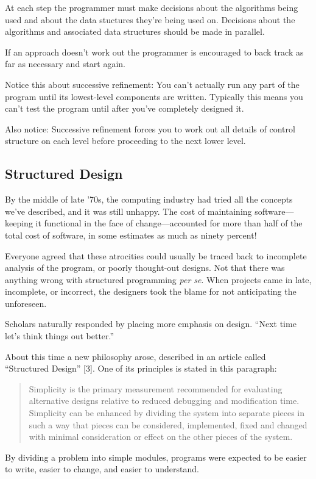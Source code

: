 At each step the programmer must make decisions about the algorithms
being used and about the data stuctures they're being used on. Decisions
about the algorithms and associated data structures should be made
in parallel.

If an approach doesn't work out the programmer is encouraged to back
track as far as necessary and start again.

Notice this about successive refinement: You can't actually run any
part of the program until its lowest-level components are written.
Typically this means you can't test the program until after you've
completely designed it. 

Also notice: Successive refinement forces you to work out all details
of control structure on each level before proceeding to the next lower
level.


\subsection{Structured Design}

By the middle of late '70s, the computing industry had tried all the
concepts we've described, and it was still unhappy. The cost of maintaining
software---keeping it functional in the face of change---accounted
for more than half of the total cost of software, in some estimates
as much as ninety percent! 


Everyone agreed that these atrocities could usually be traced back
to incomplete analysis of the program, or poorly thought-out designs.
Not that there was anything wrong with structured programming \emph{per
se}. When projects came in late, incomplete, or incorrect, the designers
took the blame for not anticipating the unforeseen. 

Scholars naturally responded by placing more emphasis on design. {}``Next
time let's think things out better.''

About this time a new philosophy arose, described in an article called
``Structured Design'' {[}3{]}. One of its principles is stated in
this paragraph: 

\begin{quote}
Simplicity is the primary measurement recommended for evaluating alternative
designs relative to reduced debugging and modification time. Simplicity
can be enhanced by dividing the system into separate pieces in such
a way that pieces can be considered, implemented, fixed and changed
with minimal consideration or effect on the other pieces of the system.
\end{quote}
By dividing a problem into simple modules, programs were expected
to be easier to write, easier to change, and easier to understand.

